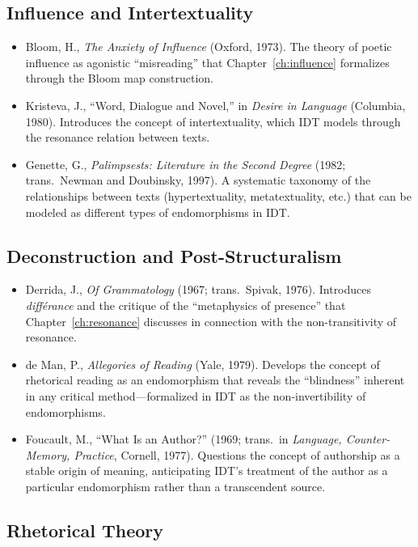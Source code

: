\documentclass[11pt,openany]{book}
\theoremstyle{definition}
\theoremstyle{plain}
\theoremstyle{remark}
\begin{document}
\subsection{Influence and Intertextuality}

\begin{itemize}
\item Bloom, H., \textit{The Anxiety of Influence} (Oxford, 1973). The theory of poetic influence as agonistic ``misreading'' that Chapter~\ref{ch:influence} formalizes through the Bloom map construction.
\item Kristeva, J., ``Word, Dialogue and Novel,'' in \textit{Desire in Language} (Columbia, 1980). Introduces the concept of intertextuality, which IDT models through the resonance relation between texts.
\item Genette, G., \textit{Palimpsests: Literature in the Second Degree} (1982; trans.~Newman and Doubinsky, 1997). A systematic taxonomy of the relationships between texts (hypertextuality, metatextuality, etc.) that can be modeled as different types of endomorphisms in IDT.
\end{itemize}

\subsection{Deconstruction and Post-Structuralism}

\begin{itemize}
\item Derrida, J., \textit{Of Grammatology} (1967; trans.~Spivak, 1976). Introduces \emph{diff\'erance} and the critique of the ``metaphysics of presence'' that Chapter~\ref{ch:resonance} discusses in connection with the non-transitivity of resonance.
\item de Man, P., \textit{Allegories of Reading} (Yale, 1979). Develops the concept of rhetorical reading as an endomorphism that reveals the ``blindness'' inherent in any critical method---formalized in IDT as the non-invertibility of endomorphisms.
\item Foucault, M., ``What Is an Author?'' (1969; trans.~in \textit{Language, Counter-Memory, Practice}, Cornell, 1977). Questions the concept of authorship as a stable origin of meaning, anticipating IDT's treatment of the author as a particular endomorphism rather than a transcendent source.
\end{itemize}

\subsection{Rhetorical Theory}
\end{document}
